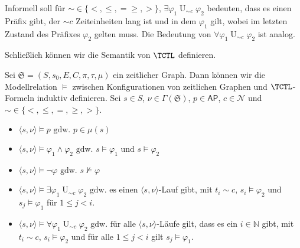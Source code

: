 Informell soll für $\sim \in \{<,\leq,=\geq,>\}$, $\exists\varphi_1 \operatorname{U}_{\sim c}\varphi_2$ bedeuten, dass es einen Präfix gibt, der $\sim c$ Zeiteinheiten lang ist und in dem $\varphi_1$ gilt, wobei im letzten Zustand des Präfixes $\varphi_2$ gelten muss.
Die Bedeutung von $\forall\varphi_1 \operatorname{U}_{\sim c}\varphi_2$ ist analog.

Schließlich können wir die Semantik von $\TCTL$ definieren.
\begin{definition}
	Sei $\mathfrak{S}=(S,s_0,E,C,\pi,\tau,\mu)$ ein zeitlicher Graph.
	Dann können wir die Modellrelation $\models$ zwischen Konfigurationen von zeitlichen Graphen und $\TCTL$-Formeln induktiv definieren. Sei $s\in S$, $\nu\in \Gamma(\mathfrak{S})$, $p\in \mathsf{AP}$, $c\in \mathcal{N}$ und $\sim\in \{<,\leq,=,\geq,>\}$. \cite{alur1990model}
	\begin{itemize}
		\item $\langle s,\nu\rangle \models p\text{ gdw. }p\in \mu(s)$
		\item $\langle s,\nu\rangle \models \varphi_1\land \varphi_2\text{ gdw. }s\models \varphi_1\text{ und }s\models \varphi_2$
		\item $\langle s,\nu \rangle \models \neg\varphi\text{ gdw. }s\not\models\varphi$
		\item $\langle s,\nu \rangle \models \exists\varphi_1 \operatorname{U}_{\sim c}\varphi_2\text{ gdw. es einen }\langle s,\nu\rangle$-Lauf gibt, mit $t_i \sim c$, $s_i\models \varphi_2$ und $s_j\models \varphi_1$ für $1\leq j < i$.
		\item $\langle s,\nu \rangle\models \forall\varphi_1 \operatorname{U}_{\sim c}\varphi_2\text{ gdw. für alle }\langle s,\nu\rangle$-Läufe gilt, dass es ein $i\in \mathbb{N}$ gibt, mit $t_i \sim c$, $s_i\models \varphi_2$ und für alle $1\leq j < i$ gilt $s_j\models \varphi_1$.
	\end{itemize}
\end{definition}

